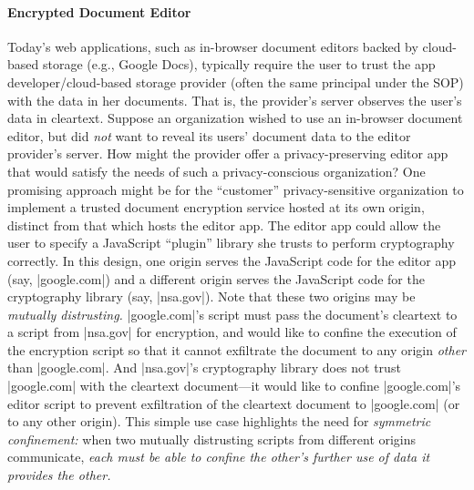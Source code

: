 \paragraph{Encrypted Document Editor}
Today's web applications, such as in-browser document editors backed
by cloud-based storage (e.g., Google Docs), typically require the user
to trust the app developer/cloud-based storage provider (often the
same principal under the SOP) with the data in her documents. That is,
the provider's server observes the user's data in cleartext. Suppose
an organization wished to use an in-browser document editor, but did
{\em not} want to reveal its users' document data to the editor
provider's server. How might the provider offer a privacy-preserving
editor app that would satisfy the needs of such a privacy-conscious
organization?  One promising approach might be for the ``customer''
privacy-sensitive organization to implement a trusted document encryption
service hosted at its own origin, distinct from that which hosts the
editor app. The editor app could allow the user to specify a JavaScript
``plugin'' library she trusts to perform cryptography correctly. In this design,
one origin serves the JavaScript code for the editor app (say,
\js|google.com|) and a different origin serves the JavaScript code for
the cryptography library (say, \js|nsa.gov|). Note that these two
origins may be {\em mutually distrusting.}  \js|google.com|'s script
must pass the document's cleartext to a script from \js|nsa.gov| for
encryption, and would like to confine the execution of the encryption
script so that it cannot exfiltrate the document to any origin {\em
other} than \js|google.com|. And \js|nsa.gov|'s cryptography library
does not trust \js|google.com| with the cleartext document---it would
like to confine \js|google.com|'s editor script to prevent
exfiltration of the cleartext document to \js|google.com| (or to any
other origin). This simple use case highlights the need for {\em
  symmetric confinement:} when two mutually distrusting scripts from
different origins communicate, {\em each must be able to confine the
  other's further use of data it provides the other.}


